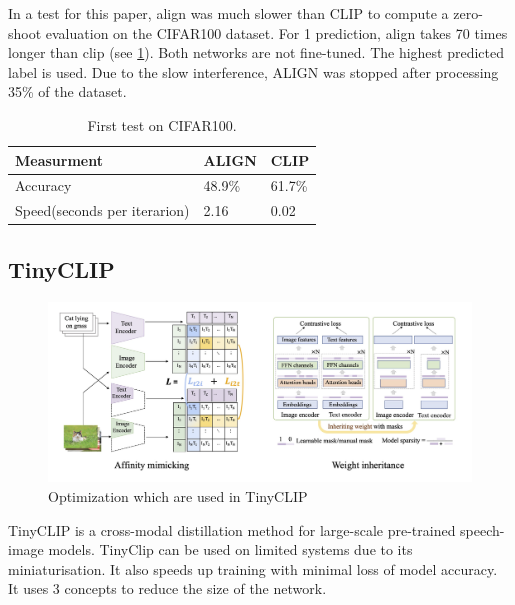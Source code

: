         In a test for this paper, \acrshort{align} was much slower than CLIP to compute a zero-shoot evaluation on the CIFAR100\cite{cifar100} dataset.
        For 1 prediction, \acrshort{align} takes 70 times longer than \acrshort{clip} (see \cref{tab:clipaligntest}).
        Both networks are not fine-tuned. The highest predicted label is used. Due to the slow interference, ALIGN was stopped after processing 35\% of the dataset.

        \begin{table}
            \centering
            \begin{tabular}{lll}
                \hline
            \textbf{Measurment}&\textbf{ALIGN}&\textbf{CLIP}\\\hline
            Accuracy& 48.9\% & 61.7\%\\
            Speed(seconds per iterarion)&  2.16&  0.02\\ \hline
            \end{tabular}
            \caption{First test on CIFAR100.}
            \label{tab:clipaligntest}
        \end{table}

        \subsection{TinyCLIP
            \label{section:tinyclip}}
        \begin{figure}
            \centering
            \includegraphics[width=\textwidth]{Images/crossmodalnetworks/TinyCLIP.jpg}
            \caption{Optimization which are used in TinyCLIP\cite{tinyclip}}
            \label{fig:crossmodalnetworks:tinyclip}
        \end{figure}

        TinyCLIP\cite{tinyclip} is a cross-modal distillation method for large-scale pre-trained speech-image models.
TinyClip can be used on limited systems due to its miniaturisation.
        It also speeds up training with minimal loss of model accuracy.
        It uses 3 concepts to reduce the size of the network.

